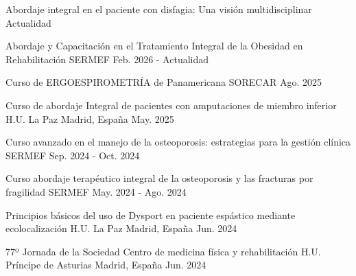 

\begin{cventries}

  \cventry
    {Abordaje integral en el paciente con disfagia: Una visión multidisciplinar} %
    {} %
    {} %
    {Actualidad} %
    {}

  \cventry
    {Abordaje y Capacitación en el Tratamiento Integral de la Obesidad en Rehabilitación} %
    {SERMEF} %
    {} %
    {Feb. 2026 - Actualidad} %
    {}

  \cventry
    {Curso de ERGOESPIROMETRÍA de Panamericana} %
    {SORECAR} %
    {} %
    {Ago. 2025} %
    {}

  \cventry
    {Curso de abordaje Integral de pacientes con amputaciones de miembro inferior} %
    {H.U. La Paz} %
    {Madrid, España} %
    {May. 2025} %
    {}

  \cventry
    {Curso avanzado en el manejo de la osteoporosis: estrategias para la gestión clínica} %
    {SERMEF} %
    {} %
    {Sep. 2024 - Oct. 2024} %
    {}

  \cventry
    {Curso abordaje terapéutico integral de la osteoporosis y las fracturas por fragilidad} %
    {SERMEF} %
    {} %
    {May. 2024 - Ago. 2024} %
    {}

  \cventry
    {Principios básicos del uso de Dysport en paciente espástico mediante ecolocalización} %
    {H.U. La Paz} %
    {Madrid, España} %
    {Jun. 2024} %
    {}

  \cventry
    {77º Jornada de la Sociedad Centro de medicina física y rehabilitación} %
    {H.U. Príncipe de Asturias} %
    {Madrid, España} %
    {Jun. 2024} %
    {}


\end{cventries}

